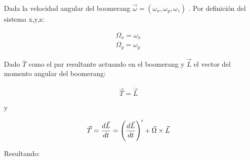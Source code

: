 	Dada la velocidad angular del boomerang $\vec{\omega} = (\omega_{x},\omega_{y},\omega_{z})$ . Por definición del sistema x,y,z:

		\begin{subequations}
		\begin{align}
		\Omega_{x} = \omega_{x} \\
		\Omega_{y} = \omega_{y}
		\end{align}
		\label{ec15}
		\end{subequations} %

	Dado $\bar{T}$ como el par resultante actuando en el boomerang y $\vec{L}$ el vector del momento angular del boomerang:

		\begin{equation}
		\vec{T} = \dot{\vec{L}}
		\label{ec16}
		\end{equation} %

	y

	    \begin{equation}
		\vec{T} = {d\vec{L}\over dt} = \left({d\vec{L}\over dt} \right)^{\prime} + \vec{\Omega} \times \vec{L}
		\label{ec17}
		\end{equation} %

	Resultando:

